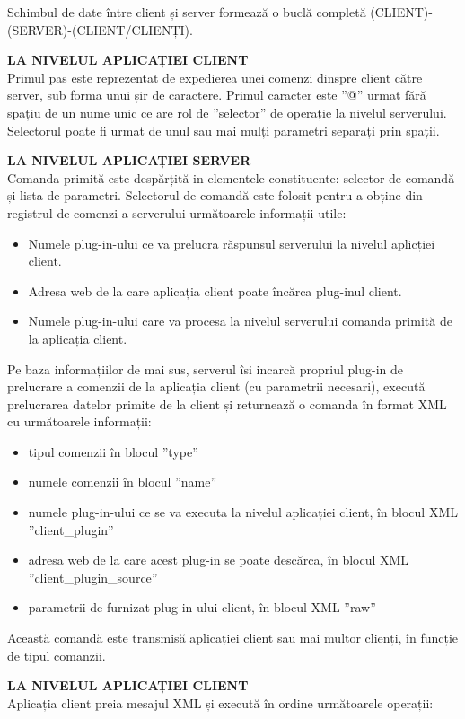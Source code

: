 \par Schimbul de date între client și server formează o buclă completă (CLIENT)-(SERVER)-(CLIENT/CLIENȚI). 
\par \textbf{LA NIVELUL APLICAȚIEI CLIENT} \\Primul pas este reprezentat de expedierea unei comenzi dinspre client către server, sub forma unui șir de caractere. Primul caracter este ”@” urmat fără spațiu de un nume unic ce are rol de ”selector” de operație la nivelul serverului. Selectorul poate fi urmat de unul sau mai mulți parametri separați prin spații.
\par \textbf{LA NIVELUL APLICAȚIEI SERVER} \\Comanda primită este despărțită in elementele constituente: selector de comandă și lista de parametri. Selectorul de comandă este folosit pentru a obține din registrul de comenzi a serverului următoarele informații utile:
\begin{itemize}
\item Numele plug-in-ului ce va prelucra răspunsul serverului la nivelul aplicției client.
\item Adresa web de la care aplicația client poate încărca plug-inul client.
\item Numele plug-in-ului care va procesa la nivelul serverului comanda primită de la aplicația client.
\end{itemize}
Pe baza informațiilor de mai sus, serverul îsi incarcă propriul plug-in de prelucrare a comenzii de la aplicația client (cu parametrii necesari), execută prelucrarea datelor primite de la client și returnează o comanda în format XML cu următoarele informații:

\begin{itemize}
\item tipul comenzii în blocul ”type”
\item numele comenzii în blocul ”name”
\item numele plug-in-ului ce se va executa la nivelul aplicației client, în blocul XML ”client\_plugin”
\item adresa web de la care acest plug-in se poate descărca, în blocul XML ”client\_plugin\_source”
\item parametrii de furnizat plug-in-ului client, în blocul XML ”raw”
\end{itemize}
Această comandă este transmisă aplicației client sau mai multor clienți, în funcție de tipul comanzii.
\par \textbf{LA NIVELUL APLICAȚIEI CLIENT} \\Aplicația client preia mesajul XML și execută în ordine următoarele operații:

